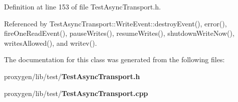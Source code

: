 Definition at line 153 of file Test\+Async\+Transport.\+h.



Referenced by Test\+Async\+Transport\+::\+Write\+Event\+::destroy\+Event(), error(), fire\+One\+Read\+Event(), pause\+Writes(), resume\+Writes(), shutdown\+Write\+Now(), writes\+Allowed(), and writev().



The documentation for this class was generated from the following files\+:\begin{DoxyCompactItemize}
\item 
proxygen/lib/test/{\bf Test\+Async\+Transport.\+h}\item 
proxygen/lib/test/{\bf Test\+Async\+Transport.\+cpp}\end{DoxyCompactItemize}
